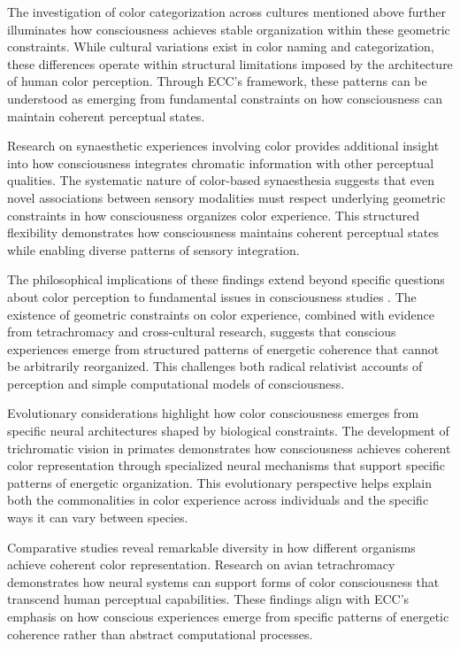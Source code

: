 \begin{refsection}
The investigation of color categorization across cultures \cite{Kay2003} mentioned above further illuminates how consciousness achieves stable organization within these geometric constraints. While cultural variations exist in color naming and categorization, these differences operate within structural limitations imposed by the architecture of human color perception. Through ECC's framework, these patterns can be understood as emerging from fundamental constraints on how consciousness can maintain coherent perceptual states.

Research on synaesthetic experiences involving color \cite{HarrisonBaronCohen1997} provides additional insight into how consciousness integrates chromatic information with other perceptual qualities. The systematic nature of color-based synaesthesia suggests that even novel associations between sensory modalities must respect underlying geometric constraints in how consciousness organizes color experience. This structured flexibility demonstrates how consciousness maintains coherent perceptual states while enabling diverse patterns of sensory integration.

The philosophical implications of these findings extend beyond specific questions about color perception to fundamental issues in consciousness studies \cite{Palmer1999}. The existence of geometric constraints on color experience, combined with evidence from tetrachromacy and cross-cultural research, suggests that conscious experiences emerge from structured patterns of energetic coherence that cannot be arbitrarily reorganized. This challenges both radical relativist accounts of perception and simple computational models of consciousness.

Evolutionary considerations highlight how color consciousness emerges from specific neural architectures shaped by biological constraints. The development of trichromatic vision in primates \cite{Neitz2017} demonstrates how consciousness achieves coherent color representation through specialized neural mechanisms that support specific patterns of energetic organization. This evolutionary perspective helps explain both the commonalities in color experience across individuals and the specific ways it can vary between species.

Comparative studies reveal remarkable diversity in how different organisms achieve coherent color representation. Research on avian tetrachromacy \cite{Wilkins2020} demonstrates how neural systems can support forms of color consciousness that transcend human perceptual capabilities. These findings align with ECC's emphasis on how conscious experiences emerge from specific patterns of energetic coherence rather than abstract computational processes.


\end{refsection}
